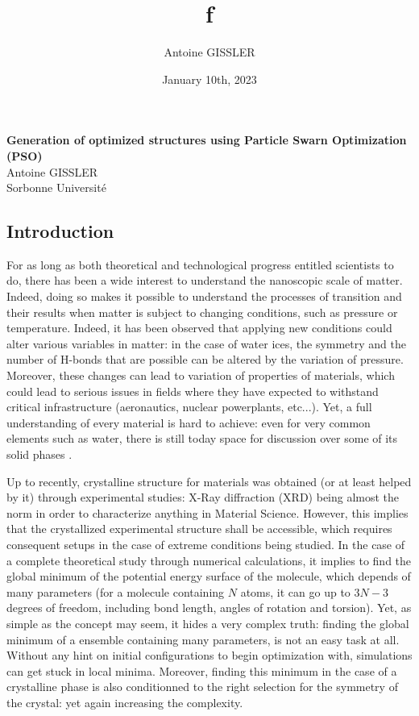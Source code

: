 \documentclass[11pt]{article}
\title{\textsf{\textbf{f}}}
\author{Antoine GISSLER}
\date{January 10th, 2023}
\begin{document}
\noindent\huge\textbf{\textsf{Generation of optimized structures using Particle Swarn Optimization (PSO)}}\normalsize\vspace{1em}\\
\large \textsf{Antoine GISSLER\\Sorbonne Université}
\begin{multicols}{2}
\section*{Introduction}

For as long as both theoretical and technological progress entitled scientists to do, there has been a wide interest to understand the nanoscopic scale of matter. Indeed, doing so makes it possible to understand the processes of transition and their results when matter is subject to changing conditions, such as pressure or temperature. Indeed, it has been observed that applying new conditions could alter various variables in matter: in the case of water ices, the symmetry and the number of H-bonds that are possible can be altered by the variation of pressure. Moreover, these changes can lead to variation of properties of materials, which could lead to serious issues in fields where they have expected to withstand critical infrastructure (aeronautics, nuclear powerplants, etc...). Yet, a full understanding of every material is hard to achieve: even for very common elements such as water, there is still today space for discussion over some of its solid phases \cite{Hansen2021-bk}.

Up to recently, crystalline structure for materials was obtained (or at least helped by it) through experimental studies: X-Ray diffraction (XRD) being almost the norm in order to characterize anything in Material Science. However, this implies that the crystallized experimental structure shall be accessible, which requires consequent setups in the case of extreme conditions being studied. In the case of a complete theoretical study through numerical calculations, it implies to find the global minimum of the potential energy surface of the molecule, which depends of many parameters (for a molecule containing $N$ atoms, it can go up to $3N-3$ degrees of freedom, including bond length, angles of rotation and torsion). Yet, as simple as the concept may seem, it hides a very complex truth: finding the global minimum of a ensemble containing many parameters, is not an easy task at all. Without any hint on initial configurations to begin optimization with, simulations can get stuck in local minima. Moreover, finding this minimum in the case of a crystalline phase is also conditionned to the right selection for the symmetry of the crystal: yet again increasing the complexity.\vspace{1em}


\end{multicols}
\end{document}
